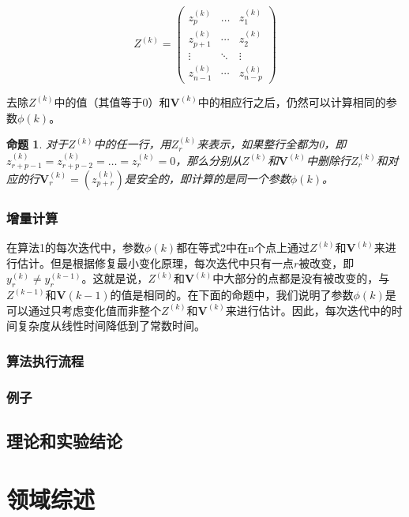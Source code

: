 \documentclass[12pt,a4paper]{article}
\newtheorem{proposition}{{命题}}
\begin{document}
\begin{equation}
Z^{(k)}=\left(\begin{array}{ccc}{z_{p}^{(k)}} & {\dots} & {z_{1}^{(k)}} \\ {z_{p+1}^{(k)}} & {\cdots} & {z_{2}^{(k)}} \\ {\vdots} & {\ddots} & {\vdots} \\ {z_{n-1}^{(k)}} & {\cdots} & {z_{n-p}^{(k)}}\end{array}\right)
\end{equation}

去除$Z^{(k)}$中的值（其值等于0）和$\boldsymbol{V}^{(k)}$中的相应行之后，仍然可以计算相同的参数$\phi(k)$。
\begin{proposition} 
对于$Z^{(k)}$中的任一行，用$Z_{r}^{(k)}$来表示，如果整行全都为0，即$z_{r+p-1}^{(k)}=z_{r+p-2}^{(k)}=\ldots=z_{r}^{(k)}=0$，那么分别从$Z^{(k)}$和$\boldsymbol{V}^{(k)}$中删除行$Z_{r}^{(k)}$和对应的行$\boldsymbol{V}_{r}^{(k)}=\left(z_{p+r}^{(k)}\right)$是安全的，即计算的是同一个参数$\phi(k)$。
\end{proposition} 


\subsubsection{增量计算}
在算法1的每次迭代中，参数$\phi(k)$都在等式2中在n个点上通过$Z^{(k)}$和$\boldsymbol{V}^{(k)}$来进行估计。但是根据修复最小变化原理，每次迭代中只有一点$r$被改变，即$y_{r}^{(k)} \neq y_{r}^{(k-1)}$。这就是说，$Z^{(k)}$和$\boldsymbol{V}^{(k)}$中大部分的点都是没有被改变的，与$Z^{(k-1)}$和$\boldsymbol{V}(k-1)$的值是相同的。在下面的命题中，我们说明了参数$\phi(k)$是可以通过只考虑变化值而非整个$Z^{(k)}$和$\boldsymbol{V}^{(k)}$来进行估计。因此，每次迭代中的时间复杂度从线性时间降低到了常数时间。
\par


\subsubsection{算法执行流程}
\subsubsection{例子}
\subsection{理论和实验结论}
\section{领域综述}
\end{document}
